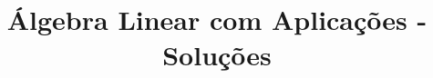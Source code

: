 \documentclass[portuguese,12pt,a4paper]{book}
\title{ Álgebra Linear com Aplicações - Soluções}
\begin{document}
	\author{}
	\maketitle
	\tableofcontents

	
	
	
	
	
	
	
	
	
	
	
	\printbibliography
\end{document}
